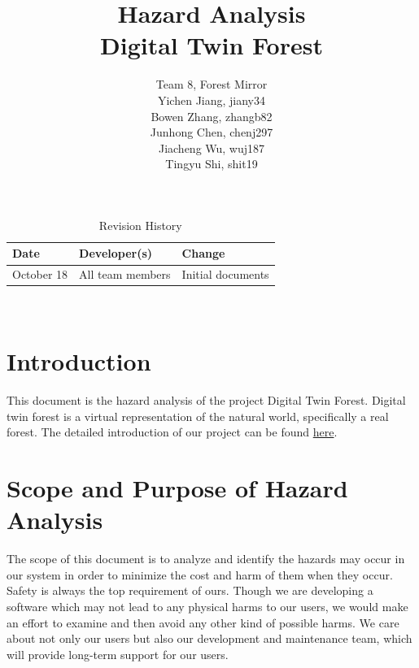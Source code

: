 \documentclass{article}
\title{Hazard Analysis\\Digital Twin Forest}
\author{Team 8, Forest Mirror
		\\ Yichen Jiang, jiany34
		\\ Bowen Zhang, zhangb82
		\\ Junhong Chen, chenj297
		\\ Jiacheng Wu, wuj187
		\\ Tingyu Shi, shit19
}
\date{}
\begin{document}
\maketitle
\thispagestyle{empty}


\begin{table}[hp]
\caption{Revision History} \label{TblRevisionHistory}
\begin{tabularx}{\textwidth}{llX}
\toprule
\textbf{Date} & \textbf{Developer(s)} & \textbf{Change}\\
\midrule
October 18 & All team members & Initial documents\\
\bottomrule
\end{tabularx}
\end{table}




~\newpage

\tableofcontents
\listoftables
\listoffigures
\cleardoublepage


\section{Introduction}

This document is the hazard analysis of the project Digital Twin Forest. Digital twin forest is a virtual representation of the natural world, specifically a real forest. The detailed introduction of our project can be found \href{https://github.com/wuj187/DigitalTwinCAS/blob/main/docs/ProblemStatementAndGoals/ProblemStatement.pdf}{here}.

\section{Scope and Purpose of Hazard Analysis}

The scope of this document is to analyze and identify the hazards may occur
in our system 
in order to minimize the cost and harm of them when they occur.\\

\noindent Safety is always the top requirement of ours. Though we are developing a software which may not lead to any physical harms to our users, we would make an effort to examine and then avoid any other kind of possible harms. We care about not only our users but also our development and maintenance team, which will
provide long-term support for our users.\\
\end{document}
